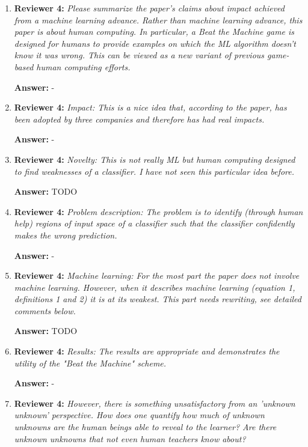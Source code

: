 \documentclass[letterpaper]{article}
\begin{document}
\begin{enumerate}

\item \textbf{Reviewer 4:} \emph{Please summarize the paper's claims about impact achieved from a machine learning advance. Rather than machine learning advance, this paper is about human computing.  In particular, a Beat the Machine game is designed for humans to provide examples on which the ML algorithm doesn't know it was wrong.  This can be viewed as a new variant of previous game-based human computing efforts.}

\textbf{Answer:} -

\item \textbf{Reviewer 4:} \emph{ Impact: This is a nice idea that, according to the paper, has been adopted by three companies and therefore has had real impacts.}

\textbf{Answer:} -

\item \textbf{Reviewer 4:} \emph{ Novelty: This is not really ML but human computing designed to find weaknesses of a classifier.  I have not seen this particular idea before.}

\textbf{Answer:} TODO

\item \textbf{Reviewer 4:} \emph{ Problem description: The problem is to identify (through human help) regions of input space of a classifier such that the classifier confidently makes the wrong prediction.}

\textbf{Answer:} -

\item \textbf{Reviewer 4:} \emph{ Machine learning: For the most part the paper does not involve machine learning.  However, when it describes machine learning (equation 1, definitions 1 and 2) it is at its weakest.  This part needs rewriting, see detailed comments below.}

\textbf{Answer:} TODO

\item \textbf{Reviewer 4:} \emph{ Results: The results are appropriate and demonstrates the utility of the "Beat the Machine" scheme.}

\textbf{Answer:} -

\item \textbf{Reviewer 4:} \emph{ However, there is something unsatisfactory from an 'unknown unknown' perspective.  How does one quantify how much of unknown unknowns are the human beings able to reveal to the learner?  Are there unknown unknowns that not even human teachers know about?}


\end{enumerate}
\end{document}
